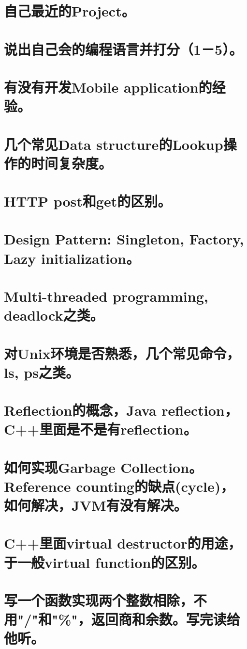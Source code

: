\documentclass[12pt]{book}
\begin{document}
\section{自己最近的Project。}
\label{sec-25-2}
\section{说出自己会的编程语言并打分（1－5）。}
\label{sec-25-3}
\section{有没有开发Mobile application的经验。}
\label{sec-25-4}
\section{几个常见Data structure的Lookup操作的时间复杂度。}
\label{sec-25-5}
\section{HTTP post和get的区别。}
\label{sec-25-6}
\section{Design Pattern: Singleton, Factory, Lazy initialization。}
\label{sec-25-7}
\section{Multi-threaded programming, deadlock之类。}
\label{sec-25-8}
\section{对Unix环境是否熟悉，几个常见命令，ls, ps之类。}
\label{sec-25-9}
\section{Reflection的概念，Java reflection，C++里面是不是有reflection。}
\label{sec-25-10}
\section{如何实现Garbage Collection。Reference counting的缺点(cycle)，如何解决，JVM有没有解决。}
\label{sec-25-11}
\section{C++里面virtual destructor的用途，于一般virtual function的区别。}
\label{sec-25-12}
\section{写一个函数实现两个整数相除，不用"/"和"\%"，返回商和余数。写完读给他听。}
\label{sec-25-13}
\end{document}
